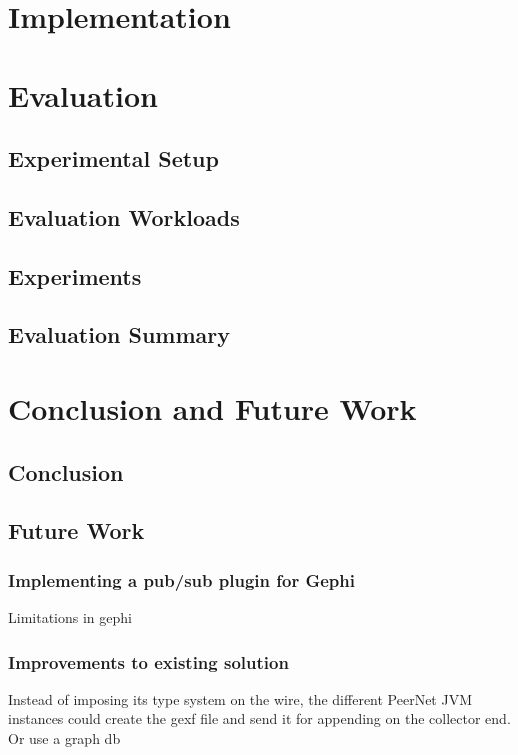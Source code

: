 \documentclass[UKenglish, a4paper]{ifimaster}
\begin{document}
\chapter{Implementation}
\label{ch:implementation}


\chapter{Evaluation}
\label{ch:evaluation}
    \section{Experimental Setup}
    \section{Evaluation Workloads}
    \section{Experiments}
    \section{Evaluation Summary}

\chapter{Conclusion and Future Work}
\label{ch:conclusion-and-future-work}
    \section{Conclusion}
    \section{Future Work}
    \subsection{Implementing a pub/sub plugin for Gephi}
        Limitations in gephi
    \subsection{Improvements to existing solution}
        Instead of imposing its type system on the wire, the different
        PeerNet JVM instances could create the gexf file and send it for
        appending on the collector end. Or use a graph db


\backmatter{}
\printbibliography{}
\end{document}
